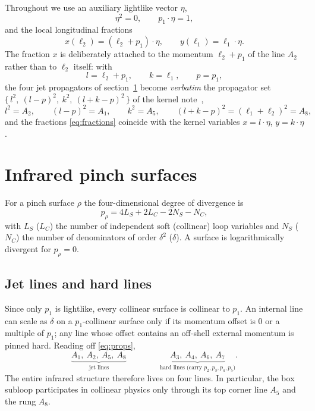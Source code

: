 \documentclass[11pt]{article}
\begin{document}
Throughout we use an auxiliary lightlike vector $\eta$,
\begin{equation}
\eta^2=0,\qquad p_1\cdot\eta=1,
\end{equation}
and the local longitudinal fractions
\begin{equation}
x(\ell_2)=(\ell_2+p_1)\cdot\eta,
\qquad
y(\ell_1)=\ell_1\cdot\eta .
\label{eq:fractions}
\end{equation}
The fraction $x$ is deliberately attached to the momentum $\ell_2+p_1$ of the line $A_2$ rather
than to $\ell_2$ itself: with
\begin{equation}
l=\ell_2+p_1,\qquad k=\ell_1,\qquad p=p_1,
\label{eq:kernelmap}
\end{equation}
the four jet propagators of section~\ref{sec:pinch} become \emph{verbatim} the propagator set
$\{\,l^2,\ (l-p)^2,\ k^2,\ (l+k-p)^2\,\}$ of the kernel note~\cite{kernel},
\begin{equation}
l^2=A_2,\qquad (l-p)^2=A_1,\qquad k^2=A_5,\qquad (l+k-p)^2=(\ell_1+\ell_2)^2=A_8,
\end{equation}
and the fractions \eqref{eq:fractions} coincide with the kernel variables $x=l\cdot\eta$,
$y=k\cdot\eta$.

\section{Infrared pinch surfaces}
\label{sec:pinch}

For a pinch surface $\rho$ the four-dimensional degree of divergence is
\begin{equation}
p_\rho=4L_S+2L_C-2N_S-N_C ,
\label{eq:degree}
\end{equation}
with $L_S$ ($L_C$) the number of independent soft (collinear) loop variables and $N_S$ ($N_C$) the
number of denominators of order $\delta^2$ ($\delta$). A surface is logarithmically divergent for
$p_\rho=0$.

\subsection{Jet lines and hard lines}
Since only $p_1$ is lightlike, every collinear surface is collinear to $p_1$. An internal line can
scale as $\delta$ on a $p_1$-collinear surface only if its momentum offset is $0$ or a multiple of
$p_1$; any line whose offset contains an off-shell external momentum is pinned hard. Reading off
\eqref{eq:props},
\begin{equation}
\underbrace{A_1,\ A_2,\ A_5,\ A_8}_{\text{jet lines}}
\qquad\qquad
\underbrace{A_3,\ A_4,\ A_6,\ A_7}_{\text{hard lines (carry }p_2,p_3,p_4,p_5)} .
\label{eq:jethard}
\end{equation}
The entire infrared structure therefore lives on four lines. In particular, the box subloop
participates in collinear physics only through its top corner line $A_5$ and the rung $A_8$.
\end{document}
